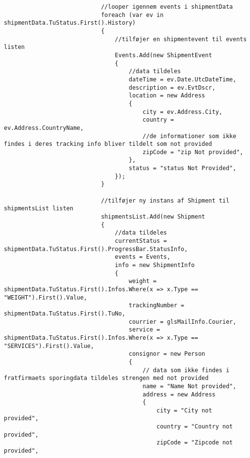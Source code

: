 \begin{verbatim}
                            //looper igennem events i shipmentData
                            foreach (var ev in shipmentData.TuStatus.First().History)
                            {
                                //tilføjer en shipmentevent til events listen
                                Events.Add(new ShipmentEvent
                                {
                                    //data tildeles
                                    dateTime = ev.Date.UtcDateTime,
                                    description = ev.EvtDscr,
                                    location = new Address
                                    {
                                        city = ev.Address.City,
                                        country = ev.Address.CountryName,
                                        //de informationer som ikke findes i deres tracking info bliver tildelt som not provided
                                        zipCode = "zip Not provided",
                                    },
                                    status = "status Not Provided",
                                });
                            }
        
                            //tilføjer ny instans af Shipment til shipmentsList listen
                            shipmentsList.Add(new Shipment
                            {
                                //data tildeles
                                currentStatus = shipmentData.TuStatus.First().ProgressBar.StatusInfo,
                                events = Events,
                                info = new ShipmentInfo
                                {
                                    weight = shipmentData.TuStatus.First().Infos.Where(x => x.Type == "WEIGHT").First().Value,
                                    trackingNumber = shipmentData.TuStatus.First().TuNo,
                                    courrier = glsMailInfo.Courier,
                                    service = shipmentData.TuStatus.First().Infos.Where(x => x.Type == "SERVICES").First().Value,
                                    consignor = new Person
                                    {
                                        // data som ikke findes i fratfirmaets sporingdata tildeles strengen med not provided
                                        name = "Name Not provided",
                                        address = new Address
                                        {
                                            city = "City not provided",
                                            country = "Country not provided",
                                            zipCode = "Zipcode not provided",
        

\end{verbatim}
